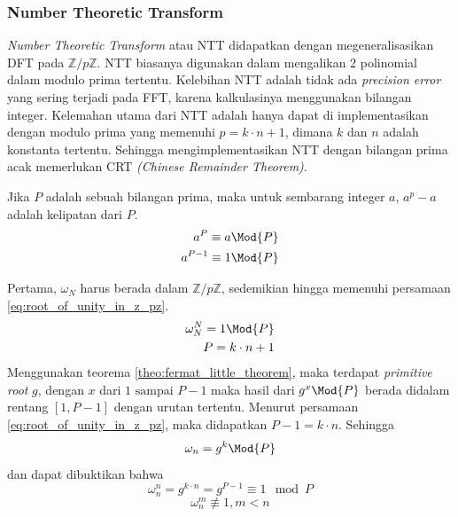 \subsubsection{ Number Theoretic Transform} \label{ssec:ntt}
\textit{Number Theoretic Transform} atau NTT didapatkan dengan megeneralisasikan DFT pada $ \mathbb{Z}/p\mathbb{Z} $. NTT biasanya digunakan dalam mengalikan 2 polinomial dalam modulo prima tertentu. Kelebihan NTT adalah tidak ada \textit{precision error} yang sering terjadi pada FFT, karena kalkulasinya menggunakan bilangan integer. Kelemahan utama dari NTT adalah hanya dapat di implementasikan dengan modulo prima yang memenuhi $ p = k \cdot n + 1 $, dimana $ k $ dan $ n $ adalah konstanta tertentu. Sehingga mengimplementasikan NTT dengan bilangan prima acak memerlukan CRT \textit{(Chinese Remainder Theorem)}.

\begin{theo}
	\label{theo:fermat_little_theorem}
	Jika $ P $ adalah sebuah bilangan prima, maka untuk sembarang integer $ a $, $ a^p - a $ adalah kelipatan dari $ P $.
	\begin{equation}
		\begin{aligned}
			a^{P} \equiv a \Mod{P} \\
			a^{P-1} \equiv 1 \Mod{P} \\
		\end{aligned}
		\label{eq:fermat_theorem}
	\end{equation}
\end{theo}

Pertama, $ \omega_N $ harus berada dalam $ \mathbb{Z}/p\mathbb{Z} $, sedemikian hingga memenuhi persamaan \eqref{eq:root_of_unity_in_z_pz}.
\begin{equation}
	\begin{aligned}
		\omega_N^N = 1 \Mod{P} \\
		P = k \cdot n + 1 \\
	\end{aligned}
	\label{eq:root_of_unity_in_z_pz}
\end{equation}
Menggunakan teorema \ref{theo:fermat_little_theorem}, maka terdapat \textit{primitive root} $ g $, dengan $ x $ dari $ 1 \text{ sampai } P-1 $ maka hasil dari $ g^x \Mod{P} $ berada didalam rentang $ [1,P-1] $ dengan urutan tertentu. Menurut persamaan \eqref{eq:root_of_unity_in_z_pz}, maka didapatkan $ P-1 = k \cdot n $\cite{ntt}. Sehingga 
$$ \omega_n = g^{k} \Mod{P} $$
dan dapat dibuktikan bahwa
$$ \omega_n^n = g^{k \cdot n} = g^{P-1} \equiv 1 \mod{P} $$
$$ \omega_n^m \not\equiv 1 , m < n $$

